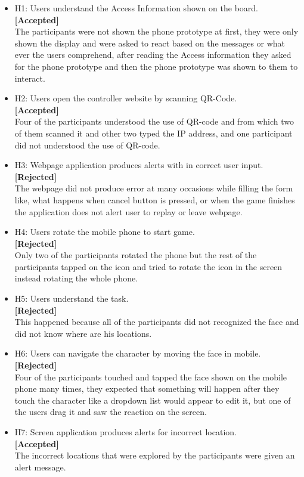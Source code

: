 \begin{itemize}
\item H1: Users understand the Access Information shown on the board. \\ 
\textbf{[Accepted]}\\
The participants were not shown the phone prototype at first, they were only shown the display and were asked to react based on the messages or what ever the users comprehend, after reading the Access information they asked for the phone prototype and then the phone prototype was shown to them to interact.

\item H2: Users open the controller website by scanning QR-Code. \\ 
\textbf{[Accepted]}\\
Four of the participants understood the use of QR-code and from which two of them scanned it and other two typed the IP address, and one participant did not understood the use of QR-code.

\item H3: Webpage application produces alerts with in correct user input.\\ 
\textbf{[Rejected]}\\
The webpage did not produce error at many occasions while filling the form like, what happens when cancel button is pressed, or when the game finishes the application does not alert user to replay or leave webpage.

\item H4: Users rotate the mobile phone to start game.\\ 
\textbf{[Rejected]}\\
Only two of the participants rotated the phone but the rest of the participants tapped on the icon and tried to rotate the icon in the screen instead rotating the whole phone.

\item H5: Users understand the task.\\ 
\textbf{[Rejected]}\\
This happened because all of the participants did not recognized the face and did not know where are his locations.

\item H6: Users can navigate the character by moving the face in mobile.\\ 
\textbf{[Rejected]}\\
Four of the participants touched and tapped the face shown on the mobile phone many times, they expected that something will happen after they touch the character like a dropdown list would appear to edit it, but one of the users drag it and saw the reaction on the screen.

\item H7: Screen application produces alerts for incorrect location.\\ 
\textbf{[Accepted]}\\
The incorrect locations that were explored by the participants were given an alert message.
\end{itemize}



